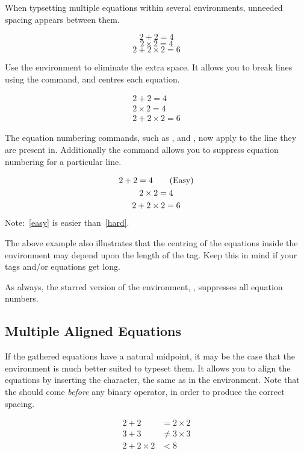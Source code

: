 When typsetting multiple equations within several  environments,
unneeded spacing appears between them.
\begin{example}
\begin{equation}
  2 + 2 = 4
\end{equation}
\begin{equation}
  2 \times 2 = 4
\end{equation}
\begin{equation}
  2 + 2 \times 2 = 6
\end{equation}
\end{example}
Use the  environment to eliminate the extra space. It allows you to break
lines using the \csi{\bs} command, and centres each equation.
\begin{example}
\begin{gather}
  2 + 2 = 4 \\
  2 \times 2 = 4 \\
  2 + 2 \times 2 = 6
\end{gather}
\end{example}
The equation numbering commands, such as ,  and ,
now apply to the line they are present in. Additionally the command
 allows you to suppress equation numbering for a
particular line.
\begin{example}
\begin{gather}
  2 + 2 = 4
    \tag{Easy}\label{easy} \\
  2 \times 2 = 4 \notag \\
  2 + 2 \times 2 = 6
    \label{hard}
\end{gather}
Note:~\eqref{easy} is easier
than~\eqref{hard}.
\end{example}
The above example also illustrates that the centring of the equations inside
the environment may depend upon the length of the tag. Keep this in mind if
your tags and/or equations get long.

As always, the starred version of the environment, , suppresses
all equation numbers.

\subsection{Multiple Aligned Equations}\label{sec:aligned_equations}

If the gathered equations have a natural midpoint, it may be the case that the
 environment is much better suited to typeset them. It allows you to
align the equations by inserting the \ai{\&} character, the same as in the
 environment. Note that the \ai{\&} should come \emph{before} any
binary operator, in order to produce the correct spacing.
\begin{example}
\begin{align}
  2 + 2 & = 2 \times 2 \\
  3 + 3 & \neq 3 \times 3 \\
  2 + 2 \times 2 & < 8
\end{align}
\end{example}

